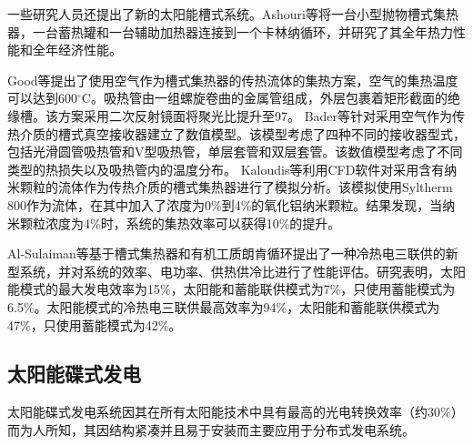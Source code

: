 一些研究人员还提出了新的太阳能槽式系统。Ashouri等\cite{Ashouri2015}将一台小型抛物槽式集热器，一台蓄热罐和一台辅助加热器连接到一个卡林纳循环，并研究了其全年热力性能和全年经济性能。

Good等\cite{Good2016}提出了使用空气作为槽式集热器的传热流体的集热方案，空气的集热温度可以达到600$\mathrm{^\circ C}$。吸热管由一组螺旋卷曲的金属管组成，外层包裹着矩形截面的绝缘槽。该方案采用二次反射镜面将聚光比提升至97。
Bader等\cite{Bader2015}针对采用空气作为传热介质的槽式真空接收器建立了数值模型。该模型考虑了四种不同的接收器型式，包括光滑圆管吸热管和V型吸热管，单层套管和双层套管。该数值模型考虑了不同类型的热损失以及吸热管内的温度分布。
Kaloudis等\cite{Kaloudis2016}利用CFD软件对采用含有纳米颗粒的流体作为传热介质的槽式集热器进行了模拟分析。该模拟使用Syltherm 800作为流体，在其中加入了浓度为0\%到4\%的氧化铝纳米颗粒。结果发现，当纳米颗粒浓度为4\%时，系统的集热效率可以获得10\%的提升。

Al-Sulaiman等\cite{AlSulaiman2012}基于槽式集热器和有机工质朗肯循环提出了一种冷热电三联供的新型系统，并对系统的效率、电功率、供热供冷比进行了性能评估。研究表明，太阳能模式的最大发电效率为15\%，太阳能和蓄能联供模式为7\%，只使用蓄能模式为6.5\%。太阳能模式的冷热电三联供最高效率为94\%，太阳能和蓄能联供模式为47\%，只使用蓄能模式为42\%。


\subsection{太阳能碟式发电}
\label{sec:pd}

太阳能碟式发电系统因其在所有太阳能技术中具有最高的光电转换效率（约30\%）而为人所知，其因结构紧凑并且易于安装而主要应用于分布式发电系统。

